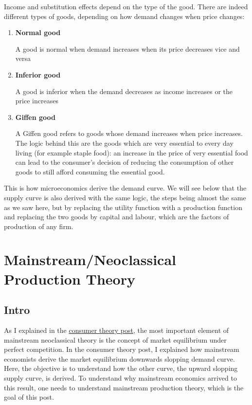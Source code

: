 \documentclass[
  letterpaper,
  DIV=11,
  numbers=noendperiod]{scrreprt}
\begin{document}
Income and substitution effects depend on the type of the good. There
are indeed different types of goods, depending on how demand changes
when price changes:

\begin{enumerate}
\def\labelenumi{\arabic{enumi}.}
\item
  \textbf{Normal good}

  A good is normal when demand increases when its price decreases vice
  and versa
\item
  \textbf{Inferior good}

  A good is inferior when the demand decreases as income increases or
  the price increases
\item
  \textbf{Giffen good}

  A Giffen good refers to goods whose demand increases when price
  increases. The logic behind this are the goods which are very
  essential to every day living (for example staple food): an increase
  in the price of very essential food can lead to the consumer's
  decision of reducing the consumption of other goods to still afford
  consuming the essential good.
\end{enumerate}

This is how microeconomics derive the demand curve. We will see below
that the supply curve is also derived with the same logic, the steps
being almost the same as we saw here, but by replacing the utility
function with a production function and replacing the two goods by
capital and labour, which are the factors of production of any firm.

\hypertarget{mainstreamneoclassical-production-theory}{%
\chapter{Mainstream/Neoclassical Production
Theory}\label{mainstreamneoclassical-production-theory}}

\hypertarget{intro}{%
\section{Intro}\label{intro}}

As I explained in the
\href{https://jeylal.github.io/myblog/economics_series/consumer\%20theory/consumer\%20theory.html}{consumer
theory post}, the most important element of mainstream neoclassical
theory is the concept of market equilibrium under perfect competition.
In the consumer theory post, I explained how mainstream economists
derive the market equilibrium downwards slopping demand curve. Here, the
objective is to understand how the other curve, the upward slopping
supply curve, is derived. To understand why mainstream economics arrived
to this result, one needs to understand mainstream production theory,
which is the goal of this post.
\end{document}

